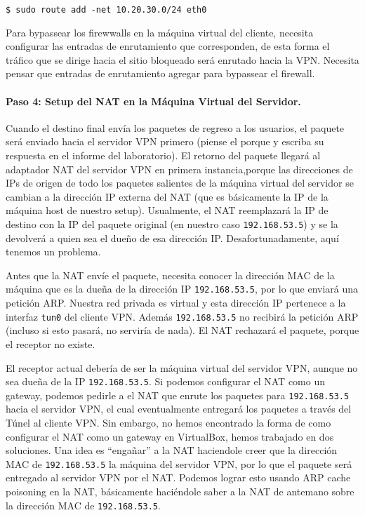 \begin{lstlisting}
$ sudo route add -net 10.20.30.0/24 eth0
\end{lstlisting}

Para bypassear los firewwalls en la máquina virtual del cliente, necesita configurar las entradas de enrutamiento que corresponden, de esta forma el tráfico que se dirige hacia el sitio bloqueado será enrutado hacia la VPN. Necesita pensar que entradas de enrutamiento agregar para bypassear el firewall.



\paragraph{Paso 4: Setup del NAT en la Máquina Virtual del Servidor.}
Cuando el destino final envía los paquetes de regreso a los usuarios, el paquete será enviado hacia el servidor VPN primero (piense el porque y escriba su respuesta en el informe del laboratorio). El retorno del paquete llegará al adaptador NAT del servidor VPN en primera instancia,porque las direcciones de IPs de origen de todo los paquetes salientes de la máquina virtual del servidor se cambian a la dirección IP externa del NAT (que es básicamente la IP de la máquina host de nuestro setup). Usualmente, el NAT reemplazará la IP de destino con la IP del paquete original (en nuestro caso \texttt{192.168.53.5}) y se la devolverá a quien sea el dueño de esa dirección IP. Desafortunadamente, aquí tenemos un problema.

Antes que la NAT envíe el paquete, necesita conocer la dirección MAC de la máquina que es la dueña de la dirección IP \texttt{192.168.53.5}, por lo que enviará una petición ARP. Nuestra red privada es virtual y esta dirección IP pertenece a la interfaz \texttt{tun0} del cliente VPN.
Además \texttt{192.168.53.5} no recibirá la petición ARP (incluso si esto pasará, no serviría de nada). El NAT rechazará el paquete, porque el receptor no existe.

El receptor actual debería de ser la máquina virtual del servidor VPN, aunque no sea dueña de la IP \texttt{192.168.53.5}. Si podemos configurar el NAT como un gateway, podemos pedirle a el NAT que enrute los paquetes para \texttt{192.168.53.5}  hacia el servidor VPN, el cual eventualmente entregará los paquetes a través del Túnel al cliente VPN. Sin embargo, no hemos encontrado la forma de como configurar el NAT como un gateway en VirtualBox, hemos trabajado en dos soluciones.
Una idea es ``engañar'' a la NAT haciendole creer que la dirección MAC de \texttt{192.168.53.5} la máquina del servidor VPN, por lo que el paquete será entregado al servidor VPN por el NAT. Podemos lograr esto usando ARP cache poisoning en la NAT, básicamente haciéndole saber a la NAT de antemano sobre la dirección MAC de \texttt{192.168.53.5}.

